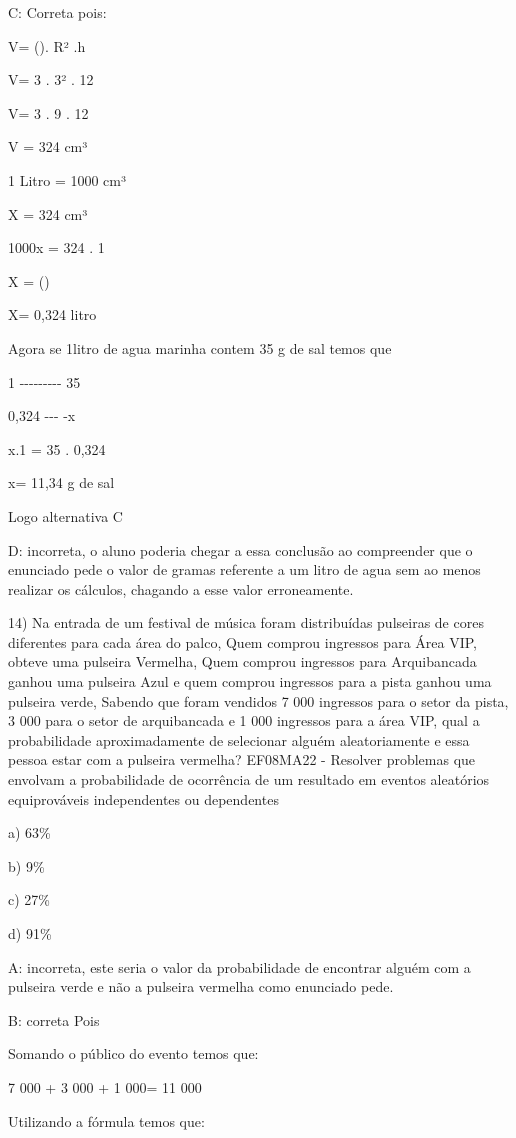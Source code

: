 C: Correta pois:

V= (\Pi). R² .h

V= 3 . 3² . 12

V= 3 . 9 . 12

V = 324 cm³

1 Litro = 1000 cm³

X = 324 cm³

1000x = 324 . 1

X = ()

X= 0,324 litro

Agora se 1litro de agua marinha contem 35 g de sal temos que

1 -\/-\/-\/-\/-\/-\/-\/-\/- 35

0,324 -\/-\/- -x

x.1 = 35 . 0,324

x= 11,34 g de sal

Logo alternativa C

D: incorreta, o aluno poderia chegar a essa conclusão ao compreender que
o enunciado pede o valor de gramas referente a um litro de agua sem ao
menos realizar os cálculos, chagando a esse valor erroneamente.

14) Na entrada de um festival de música foram distribuídas pulseiras de
cores diferentes para cada área do palco, Quem comprou ingressos para
Área VIP, obteve uma pulseira Vermelha, Quem comprou ingressos para
Arquibancada ganhou uma pulseira Azul e quem comprou ingressos para a
pista ganhou uma pulseira verde, Sabendo que foram vendidos 7 000
ingressos para o setor da pista, 3 000 para o setor de arquibancada e 1
000 ingressos para a área VIP, qual a probabilidade aproximadamente de
selecionar alguém aleatoriamente e essa pessoa estar com a pulseira
vermelha? EF08MA22 - Resolver problemas que envolvam a probabilidade de
ocorrência de um resultado em eventos aleatórios equiprováveis
independentes ou dependentes

a) 63\%

b) 9\%

c) 27\%

d) 91\%

A: incorreta, este seria o valor da probabilidade de encontrar alguém
com a pulseira verde e não a pulseira vermelha como enunciado pede.

B: correta Pois

Somando o público do evento temos que:

7 000 + 3 000 + 1 000= 11 000

Utilizando a fórmula temos que:

